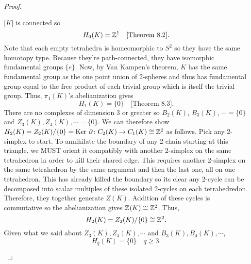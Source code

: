 \begin{proof}
\begin{enumerate}[label = (\alph*)]
\begin{center}
 \end{center}
        $|K|$ is connected so $$H_0(K) = \mathbb{Z}^1 \quad \text{[Theorem 8.2]}.$$ Note that each empty tetrahedra is homeomorphic to $S^2$ so they have the same homotopy type. Because they're path-connected, they have isomorphic fundamental groups $\{e\}$. Now, by Van Kampen's theorem, $K$ has the same fundamental group as the one point union of 2-spheres and thus has fundamental group equal to the free product of each trivial group which is itself the trivial group. Thus, $\pi_1(K)$'s abelianization gives $$H_1(K) = \{0\}\quad \text{[Theorem 8.3]}.$$ There are no complexes of dimension 3 or greater so $B_2(K)$, $B_3(K)$, $\cdots = \{0\}$ and $Z_3(K), Z_4(K), \cdots = \{0\}$. We can therefore show $H_2(K) = Z_2(K)/\{0\} = \text{Ker } \partial\colon C_{2}(K)\to C_{1}(K) \cong \mathbb{Z}^2$ as follows. Pick any 2-simplex to start. To annihilate the boundary of any 2-chain starting at this triangle, we MUST orient it compatibly with another 2-simplex on the same tetrahedron in order to kill their shared edge. This requires another 2-simplex on the same tetrahedron by the same argument and then the last one, all on one tetrahedron. This has already killed the boundary so its clear any 2-cycle can be decomposed into scalar multiples of these isolated 2-cycles on each tetrahedredon. Therefore, they together generate $Z(K)$. Addition of these cycles is commutative so the abelianization gives $\mathbb{Z}(K) \cong \mathbb{Z}^2$. Thus, $$H_2(K) = Z_2(K)/\{0\} \cong \mathbb{Z}^2.$$ Given what we said about $Z_3(K), Z_4(K), \cdots$ and $B_3(K), B_4(K), \cdots$, $$H_q(K) = \{0\} \quad q \geq 3.$$
    \end{enumerate}
\end{proof}

